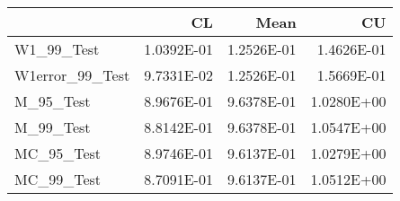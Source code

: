 \begin{tabular}{lrrr}
\toprule
{} &         CL &       Mean &         CU \\
\midrule
W1\_99\_Test      & 1.0392E-01 & 1.2526E-01 & 1.4626E-01 \\
W1error\_99\_Test & 9.7331E-02 & 1.2526E-01 & 1.5669E-01 \\
M\_95\_Test       & 8.9676E-01 & 9.6378E-01 & 1.0280E+00 \\
M\_99\_Test       & 8.8142E-01 & 9.6378E-01 & 1.0547E+00 \\
MC\_95\_Test      & 8.9746E-01 & 9.6137E-01 & 1.0279E+00 \\
MC\_99\_Test      & 8.7091E-01 & 9.6137E-01 & 1.0512E+00 \\
\bottomrule
\end{tabular}
